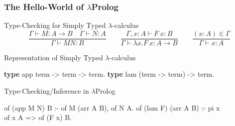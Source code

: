 \documentclass{beamer}
\begin{document}
\begin{frame}[fragile]\frametitle{The Hello-World of $\lambda$Prolog}




{\small
\begin{block}{Type-Checking for Simply Typed $\lambda$-calculus}
$$\frac{\Gamma \vdash M : A \to  B \quad \Gamma \vdash N : A}{\Gamma \vdash M N : B} \quad \quad \frac{\Gamma, x : A \vdash F~x : B}{\Gamma \vdash \lambda x. F~x : A \to B} \quad \quad \frac{(x:A) \in \Gamma}{\Gamma \vdash x : A}$$
\end{block}}

\begin{block}{Representation of Simply Typed $\lambda$-calculus}
	{\small \begin{semiverbatim}
			\textbf{type} app \hspace{1em} term -> term -> term.
			\textbf{type} lam \hspace{1em} (term -> term) -> term.
	\end{semiverbatim}}
\end{block}

\begin{block}{Type-Checking/Inference in $\lambda$Prolog}
{\small
\begin{semiverbatim}
of (app M N) B :- of M (arr A B), of N A.
of (lam F) (arr A B) :- \alert{pi x\\ of x A =>} of (F x) B.
\end{semiverbatim}}
\end{block}
\end{frame}
\end{document}
